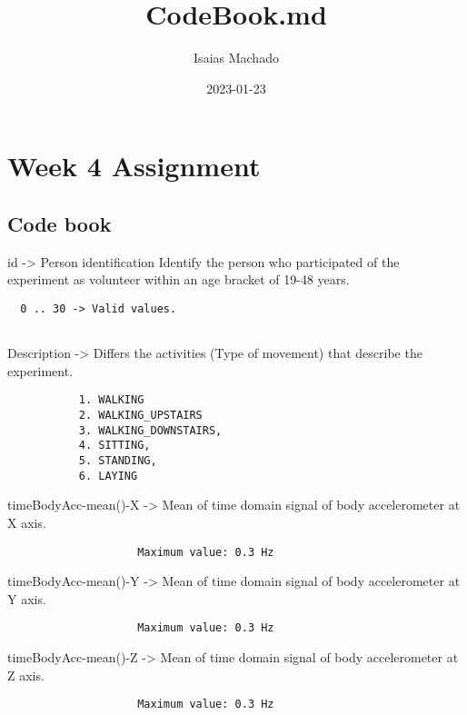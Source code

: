 \documentclass[
]{article}
\title{CodeBook.md}
\author{Isaias Machado}
\date{2023-01-23}
\begin{document}
\maketitle

\hypertarget{week-4-assignment}{%
\section{Week 4 Assignment}\label{week-4-assignment}}

\hypertarget{code-book}{%
\subsection{Code book}\label{code-book}}

id -\textgreater{} Person identification Identify the person who
participated of the experiment as volunteer within an age bracket of
19-48 years.

\begin{verbatim}
  0 .. 30 -> Valid values. 
  
\end{verbatim}

Description -\textgreater{} Differs the activities (Type of movement)
that describe the experiment.

\begin{verbatim}
           1. WALKING
           2. WALKING_UPSTAIRS 
           3. WALKING_DOWNSTAIRS, 
           4. SITTING, 
           5. STANDING, 
           6. LAYING  
\end{verbatim}

timeBodyAcc-mean()-X -\textgreater{} Mean of time domain signal of body
accelerometer at X axis.

\begin{verbatim}
                    Maximum value: 0.3 Hz
\end{verbatim}

timeBodyAcc-mean()-Y -\textgreater{} Mean of time domain signal of body
accelerometer at Y axis.

\begin{verbatim}
                    Maximum value: 0.3 Hz
\end{verbatim}

timeBodyAcc-mean()-Z -\textgreater{} Mean of time domain signal of body
accelerometer at Z axis.

\begin{verbatim}
                    Maximum value: 0.3 Hz
\end{verbatim}
\end{document}

